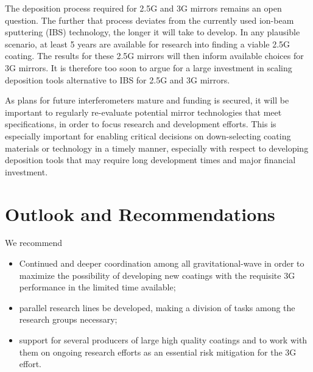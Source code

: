 The deposition process required for 2.5G and 3G mirrors remains an open question. The further that process deviates from the currently used ion-beam sputtering (IBS) technology, the longer it will take to develop. In any plausible scenario, at least 5 years are available for research into finding a viable 2.5G coating. The results for these 2.5G mirrors will then inform available choices for 3G mirrors. It is therefore too soon to argue for a large investment in scaling deposition tools alternative to IBS for 2.5G and 3G mirrors.

As plans for future interferometers mature and funding is secured, it will be important to regularly re-evaluate potential mirror technologies that meet specifications, in order to focus research and development efforts. This is especially important for enabling critical decisions on down-selecting coating materials or technology in a timely manner, especially with respect to developing deposition tools that may require long development times and major financial investment.



\section{Outlook and Recommendations}
\label{coatings_Recomm}
We recommend
\begin{itemize}
\item Continued and deeper coordination among all gravitational-wave in order to maximize the possibility of developing new coatings with the requisite 3G performance in the limited time available;
\item  parallel research lines be developed, making a division of tasks among the research groups necessary;
\item support for several producers of large high quality coatings and to work with them on ongoing research efforts as an essential risk mitigation for the 3G effort.
\end{itemize}



